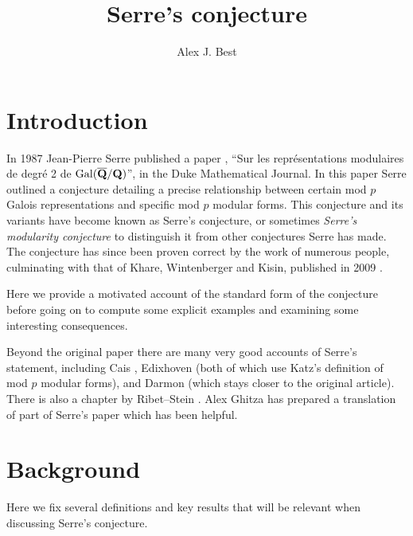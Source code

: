 \documentclass[a4paper,12pt]{article}
\title{Serre's conjecture\vspace{-11pt}} %
\author{Alex J. Best}
\begin{document}
\maketitle
\vspace{-50pt}
\tableofcontents
\clearpage


\section{Introduction}
In 1987 Jean-Pierre Serre published a paper \cite{Serre87}, ``Sur les repr\'esentations modulaires de degr\'e 2 de $\operatorname{Gal}(\overline{\mathbf{Q}}/\mathbf{Q})$'', in the Duke Mathematical Journal.
In this paper Serre outlined a conjecture detailing a precise relationship between certain mod $p$ Galois representations and specific mod $p$ modular forms.
This conjecture and its variants have become known as Serre's conjecture, or sometimes \emph{Serre's modularity conjecture} to distinguish it from other conjectures Serre has made.
The conjecture has since been proven correct by the work of numerous people, culminating with that of Khare, Wintenberger and Kisin, published in 2009 \cite{KWI,KWII,Kisin}.

Here we provide a motivated account of the standard form of the conjecture before going on to compute some explicit examples and examining some interesting consequences.

Beyond the original paper there are many very good accounts of Serre's statement, including Cais \cite{Cais}, Edixhoven \cite{Edixhoven} (both of which use Katz's definition of mod $p$ modular forms), and Darmon \cite{Darmon} (which stays closer to the original article).
There is also a chapter by Ribet--Stein \cite{RibetStein}. %
Alex Ghitza has prepared a translation of part of Serre's paper \cite{Ghitza} which has been helpful.


\section{Background}
Here we fix several definitions and key results that will be relevant when discussing Serre's conjecture.
\end{document}
